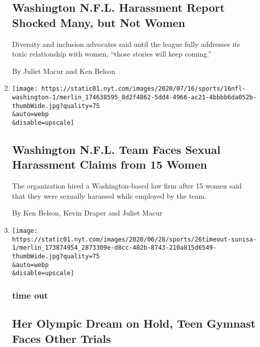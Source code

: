 \begin{enumerate}
{  \subsection{Washington N.F.L. Harassment Report Shocked Many, but Not
  Women}\label{washington-nfl-harassment-report-shocked-many-but-not-women}}

  Diversity and inclusion advocates said until the league fully
  addresses its toxic relationship with women, ``those stories will keep
  coming.''

  By Juliet Macur and Ken Belson
\item
  \href{/2020/07/16/sports/football/washington-sexual-assault-harassment-dan-snyder.html}{}

  \texttt{[image: https://static01.nyt.com/images/2020/07/16/sports/16nfl-washington-1/merlin\_174638595\_8d2f4862-5dd4-4966-ac21-4bbbb6da052b-thumbWide.jpg?quality=75\\\&auto=webp\\\&disable=upscale]}

  \hypertarget{washington-nfl-team-faces-sexual-harassment-claims-from-15-women}{%
  \subsection{Washington N.F.L. Team Faces Sexual Harassment Claims from
  15
  Women}\label{washington-nfl-team-faces-sexual-harassment-claims-from-15-women}}

  The organization hired a Washington-based law firm after 15 women said
  that they were sexually harassed while employed by the team.

  By Ken Belson, Kevin Draper and Juliet Macur
\item
  \href{/2020/06/27/sports/olympics/sunisa-lee-gymnastics-olympics.html}{}

  \texttt{[image: https://static01.nyt.com/images/2020/06/28/sports/26timeout-sunisa-1/merlin\_173874954\_2873309e-d8cc-482b-8743-210a815d6549-thumbWide.jpg?quality=75\\\&auto=webp\\\&disable=upscale]}

  \hypertarget{time-out}{%
  \subsubsection{time out}\label{time-out}}

  \hypertarget{her-olympic-dream-on-hold-teen-gymnast-faces-other-trials}{%
  \subsection{Her Olympic Dream on Hold, Teen Gymnast Faces Other
  Trials}\label{her-olympic-dream-on-hold-teen-gymnast-faces-other-trials}}


\end{enumerate}
